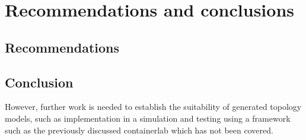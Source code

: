 \section{Recommendations and conclusions}

\subsection{Recommendations}



\subsection{Conclusion}
 However, further work is needed to establish the suitability of generated topology models, such as implementation in a simulation and testing using a framework such as the previously discussed containerlab \cite{containerlab} which has not been covered. 
